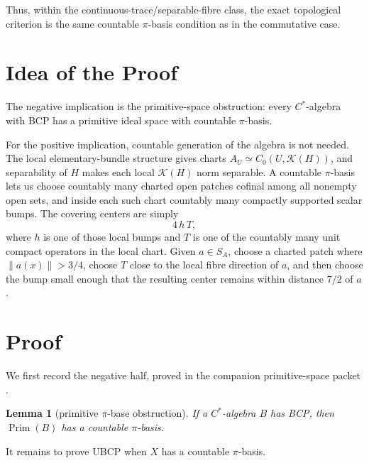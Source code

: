 \documentclass[11pt]{article}
\newtheorem{lemma}{Lemma}
\newcommand{\Kcal}{\mathcal K}
\newcommand{\Prim}{\operatorname{Prim}}
\begin{document}
Thus, within the continuous-trace/separable-fibre class, the exact topological
criterion is the same countable \(\pi\)-basis condition as in the commutative
case.

\section*{Idea of the Proof}

The negative implication is the primitive-space obstruction: every
\(C^*\)-algebra with BCP has a primitive ideal space with countable
\(\pi\)-basis.

For the positive implication, countable generation of the algebra is not
needed.  The local elementary-bundle structure gives charts
\(A_U\simeq C_0(U,\Kcal(H))\), and separability of \(H\) makes each local
\(\Kcal(H)\) norm separable.  A countable \(\pi\)-basis lets us choose
countably many charted open patches cofinal among all nonempty open sets, and
inside each such chart countably many compactly supported scalar bumps.  The
covering centers are simply
\[
        4\,h\,T,
\]
where \(h\) is one of those local bumps and \(T\) is one of the countably many
unit compact operators in the local chart.  Given \(a\in S_A\), choose a
charted patch where \(\|a(x)\|>3/4\), choose \(T\) close to the local fibre
direction of \(a\), and then choose the bump small enough that the resulting
center remains within distance \(7/2\) of \(a\).

\section*{Proof}

We first record the negative half, proved in the companion primitive-space
packet \cite{lane19primitive}.

\begin{lemma}[primitive \(\pi\)-base obstruction]
\label{lem:primitive}
If a \(C^*\)-algebra \(B\) has BCP, then \(\Prim(B)\) has a countable
\(\pi\)-basis.
\end{lemma}

It remains to prove UBCP when \(X\) has a countable \(\pi\)-basis.
\end{document}
